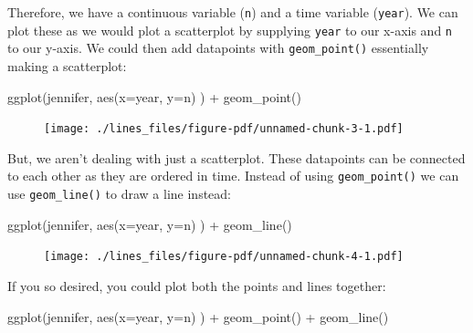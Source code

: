 \documentclass[
  letterpaper,
  DIV=11,
  numbers=noendperiod]{scrreprt}
\newenvironment{Shaded}{\begin{snugshade}}{\end{snugshade}}
\newcommand{\AttributeTok}[1]{\textcolor[rgb]{0.40,0.45,0.13}{#1}}
\newcommand{\FunctionTok}[1]{\textcolor[rgb]{0.28,0.35,0.67}{#1}}
\newcommand{\NormalTok}[1]{\textcolor[rgb]{0.00,0.23,0.31}{#1}}
\newcommand{\SpecialCharTok}[1]{\textcolor[rgb]{0.37,0.37,0.37}{#1}}
\begin{document}
Therefore, we have a continuous variable (\texttt{n}) and a time
variable (\texttt{year}). We can plot these as we would plot a
scatterplot by supplying \texttt{year} to our x-axis and \texttt{n} to
our y-axis. We could then add datapoints with \texttt{geom\_point()}
essentially making a scatterplot:

\begin{Shaded}
\begin{Highlighting}[]
\FunctionTok{ggplot}\NormalTok{(jennifer, }\FunctionTok{aes}\NormalTok{(}\AttributeTok{x=}\NormalTok{year, }\AttributeTok{y=}\NormalTok{n) ) }\SpecialCharTok{+} \FunctionTok{geom\_point}\NormalTok{() }
\end{Highlighting}
\end{Shaded}

\begin{figure}[H]

{\centering \texttt{[image: ./lines\_files/figure-pdf/unnamed-chunk-3-1.pdf]}

}

\end{figure}

But, we aren't dealing with just a scatterplot. These datapoints can be
connected to each other as they are ordered in time. Instead of using
\texttt{geom\_point()} we can use \texttt{geom\_line()} to draw a line
instead:

\begin{Shaded}
\begin{Highlighting}[]
\FunctionTok{ggplot}\NormalTok{(jennifer, }\FunctionTok{aes}\NormalTok{(}\AttributeTok{x=}\NormalTok{year, }\AttributeTok{y=}\NormalTok{n) ) }\SpecialCharTok{+} \FunctionTok{geom\_line}\NormalTok{()}
\end{Highlighting}
\end{Shaded}

\begin{figure}[H]

{\centering \texttt{[image: ./lines\_files/figure-pdf/unnamed-chunk-4-1.pdf]}

}

\end{figure}

If you so desired, you could plot both the points and lines together:

\begin{Shaded}
\begin{Highlighting}[]
\FunctionTok{ggplot}\NormalTok{(jennifer, }\FunctionTok{aes}\NormalTok{(}\AttributeTok{x=}\NormalTok{year, }\AttributeTok{y=}\NormalTok{n) ) }\SpecialCharTok{+} 
  \FunctionTok{geom\_point}\NormalTok{() }\SpecialCharTok{+}  
  \FunctionTok{geom\_line}\NormalTok{() }
\end{Highlighting}
\end{Shaded}
\end{document}
